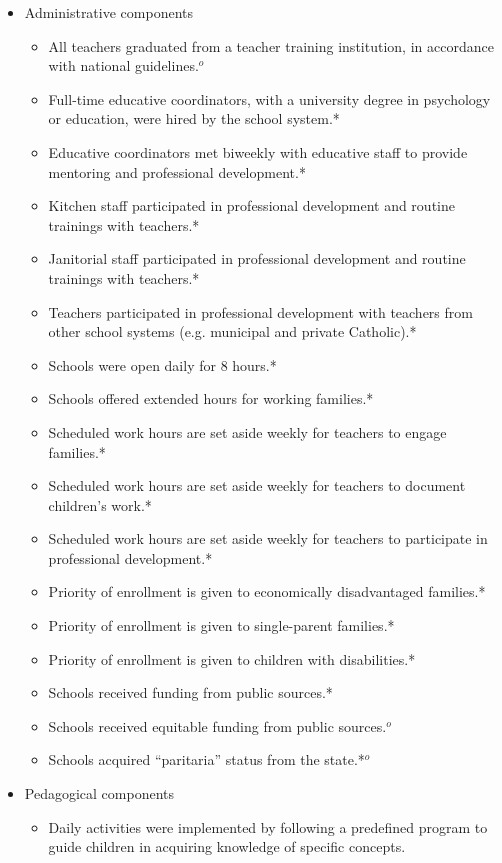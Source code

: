 \singlespacing
\begin{itemize}
 \item Administrative components
 \begin{itemize}
 	\item All teachers graduated from a teacher training institution, in accordance with national guidelines.$^o$
 	\item Full-time educative coordinators, with a university degree in psychology or education, were hired by the school system.*
 	\item Educative coordinators met biweekly with educative staff to provide mentoring and professional development.*
 	\item Kitchen staff participated in professional development and routine trainings with teachers.*
 	\item Janitorial staff participated in professional development and routine trainings with teachers.*
 	\item Teachers participated in professional development with teachers from other school systems (e.g. municipal and private Catholic).*
 	\item Schools were open daily for 8 hours.*
 	\item Schools offered extended hours for working families.*
 	\item Scheduled work hours are set aside weekly for teachers to engage families.*
 	\item Scheduled work hours are set aside weekly for teachers to document children's work.*
 	\item Scheduled work hours are set aside weekly for teachers to participate in professional development.*
 	\item Priority of enrollment is given to economically disadvantaged families.*
 	\item Priority of enrollment is given to single-parent families.*
 	\item Priority of enrollment is given to children with disabilities.*
 	\item Schools received funding from public sources.*
	\item Schools received equitable funding from public sources.$^o$
	\item Schools acquired ``paritaria'' status from the state.*$^o$
 \end{itemize}
 \item Pedagogical components
 \begin{itemize}
 	\item Daily activities were implemented by following a predefined program to guide children in acquiring knowledge of specific concepts.

\end{itemize}
\end{itemize}
